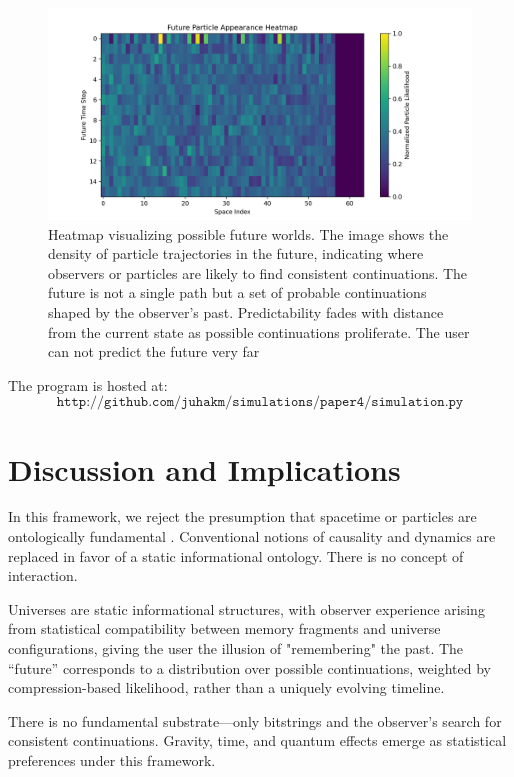 \documentclass[12pt]{article}
\begin{document}
\begin{figure}[h!]
    \centering
    \includegraphics[width=1.0\textwidth]{figures/future_particle_heatmap.png}
    \caption{Heatmap visualizing possible future worlds. The image shows the density of particle trajectories in the future, indicating where observers or particles are likely to find consistent continuations. The future is not a single path but a set of probable continuations shaped by the observer's past. Predictability fades with distance from the current state as possible continuations proliferate. The user can not predict the future very far}
    \label{fig:future_particle_heatmap}
\end{figure}


The program is hosted at:
\[
    \texttt{http://github.com/juhakm/simulations/paper4/simulation.py}
\]

\section{Discussion and Implications}

In this framework, we reject the presumption that spacetime or particles are ontologically fundamental \cite{wheeler1990it} .
Conventional notions of causality and dynamics are replaced in favor of a static informational ontology. There is no concept of interaction.

Universes are static informational structures, with observer experience arising from statistical compatibility between memory fragments and universe configurations, giving the user the illusion of "remembering" the past. The “future” corresponds to a distribution over possible continuations, weighted by compression-based likelihood, rather than a uniquely evolving timeline.

There is no fundamental substrate—only bitstrings and the observer's search for consistent continuations. Gravity, time, and quantum effects emerge as statistical preferences under this framework.
\end{document}
